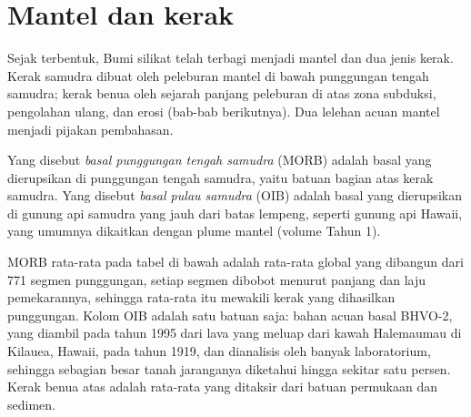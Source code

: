 \section{Mantel dan kerak}

Sejak terbentuk, Bumi silikat telah terbagi menjadi mantel dan dua
jenis kerak. Kerak samudra dibuat oleh peleburan mantel di bawah
punggungan tengah samudra; kerak benua oleh sejarah panjang peleburan di atas
zona subduksi, pengolahan ulang, dan erosi (bab-bab berikutnya). Dua lelehan acuan
mantel menjadi pijakan pembahasan.

\begin{definition}
\label{def:b2:elements-in-the-earth:morb-oib}
Yang disebut \emph{basal punggungan tengah samudra} (MORB) adalah basal
yang dierupsikan di punggungan tengah samudra, yaitu batuan bagian atas kerak samudra. Yang disebut
\emph{basal pulau samudra} (OIB) adalah basal yang dierupsikan
di gunung api samudra yang jauh dari batas lempeng, seperti gunung api Hawaii,
yang umumnya dikaitkan dengan plume mantel (volume Tahun 1).
\end{definition}

MORB rata-rata pada tabel di bawah adalah rata-rata global yang dibangun dari 771 segmen
punggungan, setiap segmen dibobot menurut panjang dan laju pemekarannya, sehingga
rata-rata itu mewakili kerak yang dihasilkan punggungan. Kolom
OIB adalah satu batuan saja: bahan acuan basal BHVO-2, yang diambil pada tahun 1995
dari lava yang meluap dari kawah Halemaumau di Kilauea, Hawaii, pada tahun 1919,
dan dianalisis oleh banyak laboratorium, sehingga sebagian besar tanah jaranganya diketahui
hingga sekitar satu persen. Kerak benua atas adalah rata-rata yang ditaksir dari
batuan permukaan dan sedimen.

